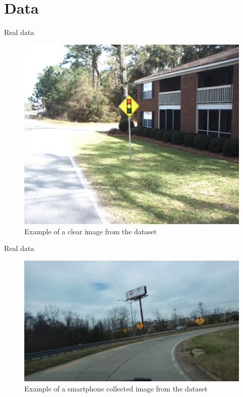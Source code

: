 \documentclass{beamer}
\begin{document}



\section{Data}
\begin{frame}{Real data}
    \begin{figure}
        \centering
        \includegraphics[width=0.7\linewidth]{figures/example_clear_image.jpg}
        \caption{Example of a clear image from the dataset}
    \end{figure}{}
\end{frame}{}

\begin{frame}{Real data}
    \begin{figure}
        \centering
        \includegraphics[width=0.9\linewidth]{figures/example_bad_image.jpg}
        \caption{Example of a smartphone collected image from the dataset}
    \end{figure}{}
\end{frame}{}
\end{document}

